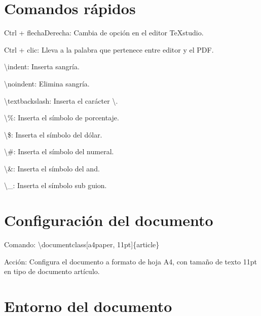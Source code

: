 \documentclass[a4paper,11pt]{article}
\begin{document}
	\begin{flushleft} \color{colorGris2}
		
		\section{Comandos rápidos}
		
		Ctrl + flechaDerecha: Cambia de opción en el editor TeXstudio.\newline
		
		Ctrl + clic: Lleva a la palabra que pertenece entre editor y el PDF.\newline
		
		\textbackslash indent: Inserta sangría.\newline
		
		\textbackslash noindent: Elimina sangría.\newline
		
		\textbackslash textbackslash: Inserta el carácter \textbackslash.\newline
		
		\textbackslash \%: Inserta el símbolo de porcentaje.\newline
		
		\textbackslash \$: Inserta el símbolo del dólar.\newline
		
		\textbackslash \#: Inserta el símbolo del numeral.\newline
		
		\textbackslash \&: Inserta el símbolo del and.\newline
		
		\textbackslash \_: Inserta el símbolo sub guion.\newline
		
		\section{Configuración del documento}
		
		Comando: \textbackslash documentclass[a4paper, 11pt]\{article\}\newline
			
		Acción: Configura el documento  a formato de hoja A4, con tamaño de texto 11pt en tipo de documento artículo.\newline
			
		\section{Entorno del documento}
			

\end{flushleft}
\end{document}
